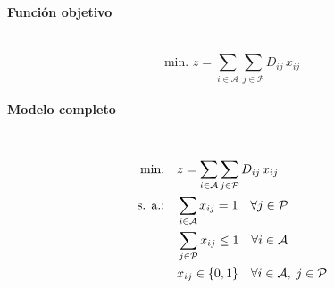 \paragraph{Función objetivo}\mbox{}\\
\begin{equation}
\mbox{min. } z = \sum_{i \in \mathcal{A}} \sum_{j \in \mathcal{P}} D_{ij}\, x_{ij}
\end{equation}

\paragraph{Modelo completo}\mbox{}\\
\begin{align}
\mbox{min.} \quad & z = \sum_{i \in \mathcal{A}} \sum_{j \in \mathcal{P}} D_{ij}\, x_{ij} \notag \\
\mbox{s. a.:} \quad & \sum_{i \in \mathcal{A}} x_{ij} = 1 \quad \forall j \in \mathcal{P} \notag \\
& \sum_{j \in \mathcal{P}} x_{ij} \leq 1 \quad \forall i \in \mathcal{A} \notag \\
& x_{ij} \in \{0,1\} \quad \forall i \in \mathcal{A},\; j \in \mathcal{P} \notag
\end{align}
